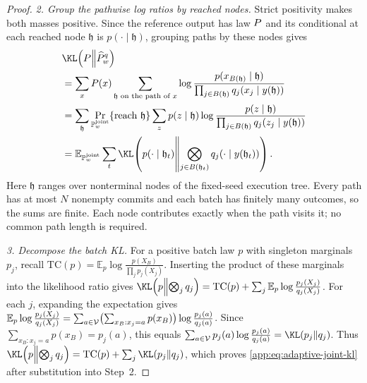 \begin{proof}
{\emph{2. Group the pathwise log ratios by reached nodes.}
Strict positivity makes both masses positive.  Since the reference output
has law $P$ and its conditional at each reached node $\mathfrak h$
is $p(\cdot\mid\mathfrak h)$, grouping paths by these nodes gives
\begin{align*}
 &\KLDivergence{\TargetLaw}{\SamplerOutputLaw{w}{\FrozenOracle}}\\
 &=\sum_x\TargetLaw(x)
   \sum_{\mathfrak h\text{ on the path of }x}
   \log\frac{p(x_{B(\mathfrak h)}\mid\mathfrak h)}
             {\prod_{j\in B(\mathfrak h)}
               \OracleRowMass{y(\mathfrak h)}{j}{x_j}}\\
 &=\sum_{\mathfrak h}
   \Pr_{\JointReferenceLaw{w}}\{\text{reach }\mathfrak h\}
   \sum_z p(z\mid\mathfrak h)
   \log\frac{p(z\mid\mathfrak h)}
             {\prod_{j\in B(\mathfrak h)}
               \OracleRowMass{y(\mathfrak h)}{j}{z_j}}\\
 &=\mathbb E_{\JointReferenceLaw{w}}\sum_t
   \KLDivergence{\JointBatchLaw{\mathfrak h_t}}
     {\bigotimes_{j\in B(\mathfrak h_t)}\OracleRow{y(\mathfrak h_t)}{j}}.
\end{align*}
Here $\mathfrak h$ ranges over nonterminal nodes of the fixed-seed execution
tree.  Every path has at most $N$ nonempty commits and each batch has finitely
many outcomes, so the sums are finite.  Each node contributes exactly when
the path visits it; no common path length is required.


\emph{3. Decompose the batch KL.}
For a positive batch law $p$ with singleton marginals $p_j$, recall
$\mathrm{TC}(p)
 =\mathbb E_p\log\frac{p(X_B)}{\prod_jp_j(X_j)}$.
Inserting the product of these marginals into the likelihood ratio gives
$\KLDivergence{p}{\bigotimes_jq_j}
 =\mathrm{TC}(p)
  +\sum_j\mathbb E_p\log\frac{p_j(X_j)}{q_j(X_j)}$.
For each $j$, expanding the expectation gives
$\mathbb E_p\log\frac{p_j(X_j)}{q_j(X_j)}
 =\sum_{a\in\mathcal V}\bigl(\sum_{x_B:x_j=a}p(x_B)\bigr)
     \log\frac{p_j(a)}{q_j(a)}$.
Since $\sum_{x_B:x_j=a}p(x_B)=p_j(a)$, this equals
$\sum_{a\in\Vocab}p_j(a)\log\frac{p_j(a)}{q_j(a)}
 =\KLDivergence{p_j}{q_j}$.
Thus $\KLDivergence{p}{\bigotimes_jq_j}
 =\mathrm{TC}(p)+\sum_j\KLDivergence{p_j}{q_j}$, which proves
\eqref{app:eq:adaptive-joint-kl} after substitution into Step~2.

}
\end{proof}
